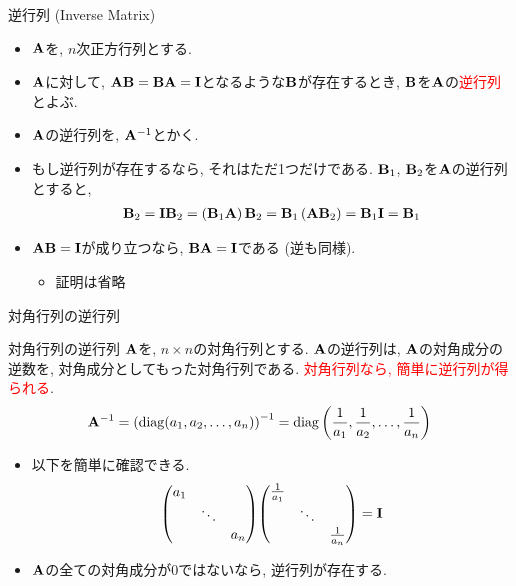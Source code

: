 \documentclass[dvipdfmx,notheorems,t]{beamer}
\begin{document}
\begin{frame}{逆行列 (Inverse Matrix)}
\begin{itemize}
  \item $\vb{A}$を, $n$次正方行列とする.
  \item $\vb{A}$に対して, $\vb{A} \vb{B} = \vb{B} \vb{A} = \vb{I}$となるような$\vb{B}$が存在するとき,
  $\vb{B}$を$\vb{A}$の\textcolor{red}{逆行列}とよぶ.
  \item $\vb{A}$の逆行列を, $\vb{A}^{-1}$とかく.
  \item もし逆行列が存在するなら, それはただ1つだけである.
  $\vb{B}_1$, $\vb{B}_2$を$\vb{A}$の逆行列とすると,
  \begin{align*}
    \vb{B}_2 = \vb{I} \vb{B}_2 = \left( \vb{B}_1 \vb{A} \right) \vb{B}_2
      = \vb{B}_1 \left( \vb{A} \vb{B}_2 \right) = \vb{B}_1 \vb{I} = \vb{B}_1
  \end{align*}
  \item $\vb{A} \vb{B} = \vb{I}$が成り立つなら, $\vb{B} \vb{A} = \vb{I}$である (逆も同様).
  \begin{itemize}
    \item 証明は省略
  \end{itemize}
\end{itemize}
\end{frame}

\begin{frame}{対角行列の逆行列}
\begin{block}{対角行列の逆行列}
  $\vb{A}$を, $n \times n$の対角行列とする.
  $\vb{A}$の逆行列は, $\vb{A}$の対角成分の逆数を, 対角成分としてもった対角行列である.
  \textcolor{red}{対角行列なら, 簡単に逆行列が得られる}.
  $$\vb{A}^{-1} = \left( \operatorname{diag}(a_1, a_2, \ldots, a_n) \right)^{-1}
    = \operatorname{diag}\left( \frac{1}{a_1}, \frac{1}{a_2}, \ldots, \frac{1}{a_n} \right)$$
\end{block}
\begin{itemize}
  \item 以下を簡単に確認できる.
  \begin{align*}
    \mqty(\dmat{a_1, \ddots, a_n})
      \mqty(\dmat{\frac{1}{a_1}, \ddots, \frac{1}{a_n}}) = \vb{I}
  \end{align*}
  \item $\vb{A}$の全ての対角成分が$0$ではないなら, 逆行列が存在する.
\end{itemize}
\end{frame}
\end{document}

